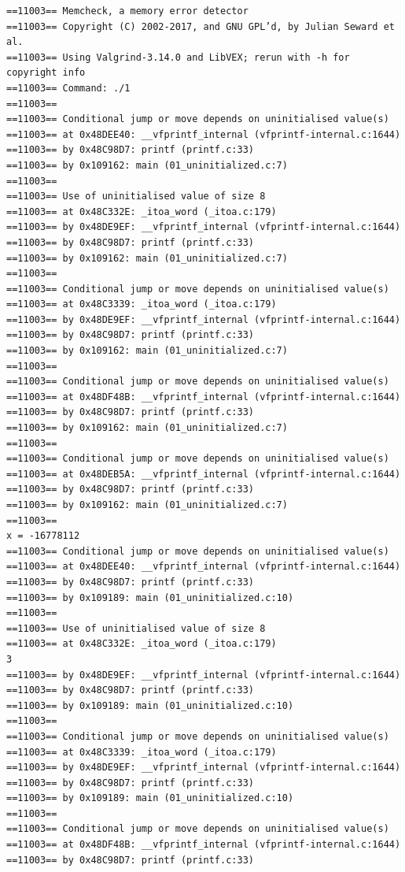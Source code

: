\begin{verbatim}
==11003== Memcheck, a memory error detector
==11003== Copyright (C) 2002-2017, and GNU GPL’d, by Julian Seward et al.
==11003== Using Valgrind-3.14.0 and LibVEX; rerun with -h for copyright info
==11003== Command: ./1
==11003==
==11003== Conditional jump or move depends on uninitialised value(s)
==11003== at 0x48DEE40: __vfprintf_internal (vfprintf-internal.c:1644)
==11003== by 0x48C98D7: printf (printf.c:33)
==11003== by 0x109162: main (01_uninitialized.c:7)
==11003==
==11003== Use of uninitialised value of size 8
==11003== at 0x48C332E: _itoa_word (_itoa.c:179)
==11003== by 0x48DE9EF: __vfprintf_internal (vfprintf-internal.c:1644)
==11003== by 0x48C98D7: printf (printf.c:33)
==11003== by 0x109162: main (01_uninitialized.c:7)
==11003==
==11003== Conditional jump or move depends on uninitialised value(s)
==11003== at 0x48C3339: _itoa_word (_itoa.c:179)
==11003== by 0x48DE9EF: __vfprintf_internal (vfprintf-internal.c:1644)
==11003== by 0x48C98D7: printf (printf.c:33)
==11003== by 0x109162: main (01_uninitialized.c:7)
==11003==
==11003== Conditional jump or move depends on uninitialised value(s)
==11003== at 0x48DF48B: __vfprintf_internal (vfprintf-internal.c:1644)
==11003== by 0x48C98D7: printf (printf.c:33)
==11003== by 0x109162: main (01_uninitialized.c:7)
==11003==
==11003== Conditional jump or move depends on uninitialised value(s)
==11003== at 0x48DEB5A: __vfprintf_internal (vfprintf-internal.c:1644)
==11003== by 0x48C98D7: printf (printf.c:33)
==11003== by 0x109162: main (01_uninitialized.c:7)
==11003==
x = -16778112
==11003== Conditional jump or move depends on uninitialised value(s)
==11003== at 0x48DEE40: __vfprintf_internal (vfprintf-internal.c:1644)
==11003== by 0x48C98D7: printf (printf.c:33)
==11003== by 0x109189: main (01_uninitialized.c:10)
==11003==
==11003== Use of uninitialised value of size 8
==11003== at 0x48C332E: _itoa_word (_itoa.c:179)
3
==11003== by 0x48DE9EF: __vfprintf_internal (vfprintf-internal.c:1644)
==11003== by 0x48C98D7: printf (printf.c:33)
==11003== by 0x109189: main (01_uninitialized.c:10)
==11003==
==11003== Conditional jump or move depends on uninitialised value(s)
==11003== at 0x48C3339: _itoa_word (_itoa.c:179)
==11003== by 0x48DE9EF: __vfprintf_internal (vfprintf-internal.c:1644)
==11003== by 0x48C98D7: printf (printf.c:33)
==11003== by 0x109189: main (01_uninitialized.c:10)
==11003==
==11003== Conditional jump or move depends on uninitialised value(s)
==11003== at 0x48DF48B: __vfprintf_internal (vfprintf-internal.c:1644)
==11003== by 0x48C98D7: printf (printf.c:33)

\end{verbatim}

